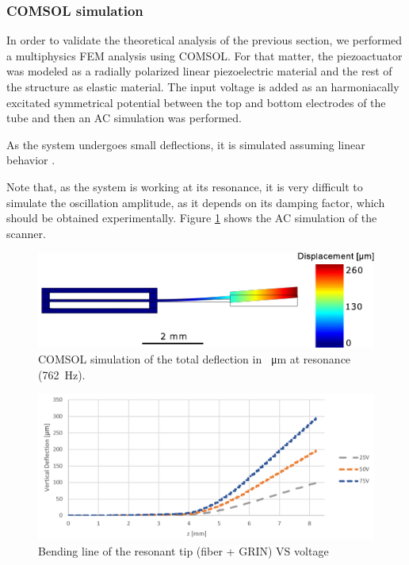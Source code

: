 \subsubsection{COMSOL simulation}
In order to validate the theoretical analysis of the previous section, we performed a multiphysics FEM analysis using COMSOL. For that matter, the piezoactuator was modeled as a radially polarized linear piezoelectric material and the rest of the structure as elastic material. The input voltage is added as an harmoniacally excitated symmetrical potential between the top and bottom electrodes of the tube and then an AC simulation was performed. 

As the system undergoes small deflections, it is simulated assuming linear behavior \cite{Fertis2006}.

Note that, as the system is working at its resonance, it is very difficult to simulate the oscillation amplitude, as it depends on its damping factor, which should be obtained experimentally. Figure \ref{fig:defle} shows the AC simulation of the scanner.

\begin{figure}[h!]\centering
      \includegraphics[width=10 cm]{figures/30_DesignSimulation/Mechanical/deflection.pdf}
      \caption{COMSOL simulation of the total deflection in \SI{}{\micro\meter}  at resonance (\SI{762}{\hertz}).}
      \label{fig:defle}
\end{figure}

\begin{figure}[h!]\centering
      \includegraphics[width=10 cm]{figures/30_DesignSimulation/Mechanical/vsweep.png}
      \caption{Bending line of the resonant tip (fiber + GRIN) VS voltage}
      \label{fig:vsweep}
\end{figure}


